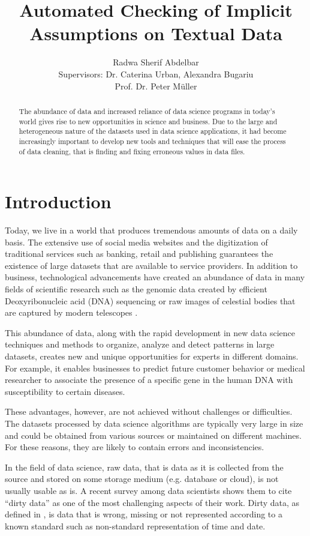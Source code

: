 \documentclass[10pt]{report}
\title{Automated Checking of Implicit Assumptions on Textual Data }
\author{Radwa Sherif Abdelbar \\
	 Supervisors: Dr. Caterina Urban, Alexandra Bugariu \\ Prof. Dr. Peter M{\"u}ller}
\begin{document}
\maketitle



\begin{abstract}
The abundance of data and increased reliance of data science programs in today's world gives rise to new opportunities in science and business. Due to the large and heterogeneous nature of the datasets used in data science applications, it had become increasingly important to develop new tools and techniques that will ease the process of data cleaning, that is finding and fixing erroneous values in data files.  
\end{abstract}

\chapter{Introduction}

Today, we live in a world that produces tremendous amounts of data on a daily basis. The extensive use of social media websites and the digitization of traditional services such as banking, retail and publishing guarantees the existence of large datasets that are available to service providers. In addition to business, technological advancements have created an abundance of data in many fields of scientific research such as the genomic data created by efficient Deoxyribonucleic acid (DNA) sequencing or raw images of celestial bodies that are captured by modern telescopes \cite{blei2017science}. 

This abundance of data, along with the rapid development in new data science techniques and methods to organize, analyze and detect patterns in large datasets, creates new and unique opportunities for experts in different domains. For example, it enables businesses to predict future customer behavior or medical researcher to associate the presence of a specific gene in the human DNA with susceptibility to certain diseases. 

These advantages, however, are not achieved without challenges or difficulties. The datasets processed by data science algorithms are typically very large in size and could be obtained from various sources or maintained on different machines. For these reasons, they are likely to contain errors and inconsistencies. 

In the field of data science, raw data, that is data as it is collected from the source and stored on some storage medium (e.g. database or cloud), is not usually usable as is. A recent survey among data scientists \cite{kaggle} shows them to cite ``dirty data'' as one of the most challenging aspects of their work. Dirty data, as defined in \cite{dirty-data}, is data that is wrong, missing or not represented according to a known standard such as non-standard representation of time and date.
\end{document}
